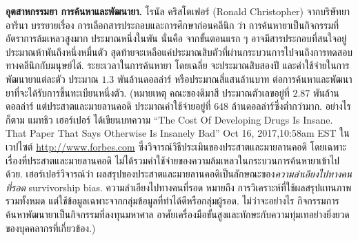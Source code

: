 {\begin{shaded}
\textbf{อุตสาหกรรมยา การค้นหาและพัฒนายา.} 
โรนัล คริสโตเฟอร์ (Ronald Christopher) จากบริษัทยาอารีนา 
บรรยายเรื่อง การเลือกสารประกอบและการศึกษาก่อนคลีนิก\cite{CourseraDrugDiscovery}
ว่า
การค้นหายาเป็นกิจกรรมที่อัตราการล้มเหลวสูงมาก ประมาณหนึ่งในพัน
นั่นคือ จากขั้นตอนแรก ๆ อาจมีสารประกอบที่สนใจอยู่ประมาณห้าพันถึงหนึ่งหมื่นตัว
สุดท้ายจะเหลือแค่ประมาณสิบตัวที่ผ่านกระบวนการไปจนถึงการทดสอบทางคลีนิกกับมนุษย์ได้.
ระยะเวลาในการค้นหายา โดยเฉลี่ย จะประมาณสิบสองปี
และค่าใช้จ่ายในการพัฒนายาแต่ละตัว ประมาณ $1.3$ พันล้านดอลล่าร์%
หรือประมาณสี่แสนล้านบาท ต่อการค้นหาและพัฒนายาที่จะได้รับการขึ้นทะเบียนหนึ่งตัว.
(หมายเหตุ
คณะของดิมาสี\cite{DiMasiEtAl2016} ประมาณตัวเลขอยู่ที่ $2.87$ พันล้านดอลล่าร์
แต่ประสาตและมายลานคอดิ\cite{PrasadMailankody2017} ประมาณค่าใช้จ่ายอยู่ที่ 
$648$ ล้านดอลล่าร์ซึ่งต่ำกว่ามาก.
อย่างไรก็ตาม
แมทธิว เฮอร์เปอร์ 
ได้เขียนบทความ ``The Cost Of Developing Drugs Is Insane. That Paper That Says Otherwise Is Insanely Bad'' Oct 16, 2017,10:58am EST ในเวปไซต์ \url{http://www.forbes.com} 
ซึ่งวิจารณ์วิธีประเมินของประสาตและมายลานคอดิ
โดยเฉพาะเรื่องที่ประสาตและมายลานคอดิ ไม่ได้รวมค่าใช้จ่ายของความล้มเหลวในกระบวนการค้นหายาเข้าไปด้วย.
เฮอร์เปอร์วิจารณ์ว่า ผลสรุปของประสาตและมายลานคอดิเป็นลักษณะของ\textit{ความลำเอียงไปทางคนที่รอด} survivorship bias.
ความลำเอียงไปทางคนที่รอด หมายถึง
การวิเคราะห์ที่ใช้ผลสรุปแทนภาพรวมทั้งหมด แต่ใช้ข้อมูลเฉพาะจากกลุ่มข้อมูลที่ทำได้ดีหรือกลุ่มผู้รอด.
ไม่ว่าจะอย่างไร กิจกรรมการค้นหาพัฒนายาเป็นกิจกรรมที่ลงทุนมหาศาล อาศัยเครื่องมือขั้นสูงและทักษะกับความทุ่มเทอย่างยิ่งยวดของบุคคลากรที่เกี่ยวข้อง.)



%
%
%


\end{shaded}}
